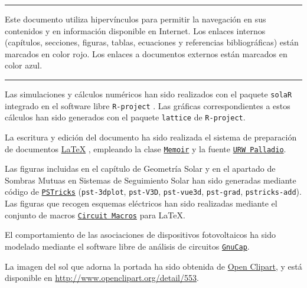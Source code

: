 
\chapterprecis{\vfill{}}

\rule[.5ex]{\linewidth}{1pt}

Este documento utiliza hipervínculos para permitir la navegación en
sus contenidos y en información disponible en Internet. Los enlaces
internos (capítulos, secciones, figuras, tablas, ecuaciones y
referencias bibliográficas) están marcados en color rojo. Los enlaces
a documentos externos están marcados en color azul.

\rule[.5ex]{\linewidth}{1pt}
Las simulaciones y cálculos numéricos han sido realizados con el paquete
\texttt{solaR} \cite{Perpinan2012b} integrado en el software libre
\texttt{R-project} \cite{RDevelopmentCoreTeam2013}. Las gráficas
correspondientes a estos cálculos han sido generados con el paquete
\texttt{lattice} \cite{Sarkar2010} de \texttt{R-project}. 

La escritura y edición del documento ha sido realizada el sistema de preparación
de documentos \href{http://www.latex-project.org/}{\LaTeX{}} , empleando
la clase \href{http://www.ctan.org/tex-archive/macros/latex/contrib/memoir/}{\texttt{Memoir}}
y la fuente \href{http://www.tug.dk/FontCatalogue/palatino/}{\texttt{URW Palladio}}.

Las figuras incluidas en el capítulo de Geometría Solar y en el
apartado de Sombras Mutuas en Sistemas de Seguimiento Solar han sido
generadas mediante código de
\href{http://www.tug.org/PSTricks}{\texttt{PSTricks}}
(\texttt{pst-3dplot}, \texttt{pst-V3D}, \texttt{pst-vue3d},
\texttt{pst-grad}, \texttt{pstricks-add}).  Las figuras que recogen
esquemas eléctricos han sido realizadas mediante el conjunto de macros
\href{http://ece.uwaterloo.ca/~aplevich/Circuit_macros/}{\texttt{Circuit
    Macros}} para \LaTeX{}.

El comportamiento de las asociaciones de dispositivos fotovoltaicos
ha sido modelado mediante el software libre de análisis de circuitos
\href{http://www.gnu.org/software/gnucap/}{\texttt{GnuCap}}.

La imagen del sol que adorna la portada ha sido obtenida de
\href{http://www.openclipart.org/}{Open Clipart}, y está disponible en \url{http://www.openclipart.org/detail/553}.



